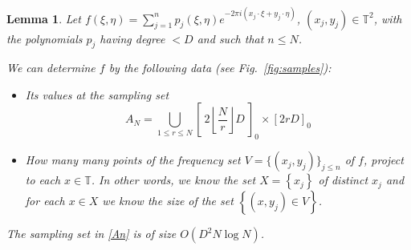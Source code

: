 \documentclass[12pt,a4paper,oneside]{amsart}
\newtheorem{lemma}{Lemma}[section]
\theoremstyle{definition}
\newcommand{\Floor}[1]{{\left\lfloor{#1}\right\rfloor}}
\newcommand{\Set}[1]{{\left\{{#1}\right\}}}
\newcommand{\TT}{{\mathbb T}}
\newcommand{\red}[1]{{#1}}
\newcounter{rem}
\begin{document}
\begin{lemma}\label{NlogN}
Let $f(\xi,\eta)= \sum_{j=1}^n p_j (\xi,\eta) e^{-2\pi i (x_j \cdot \xi + y_j \cdot \eta )}$\red{, $(x_j, y_j) \in \TT^2$,}  with the polynomials $p_j$ having degree $< D$ and such that $n \le N$.

We can determine $f$ by the following data (see Fig.\ \ref{fig:samples}):
\begin{itemize}
\item[(a)] Its values at the sampling set
\begin{equation}\label{An}
A_N = \bigcup_{1\le r\le N} \left[ \: 2\Floor{ \frac{N}{r}} D \: \right]_0 \times [2rD]_0
\end{equation}
\item[(b)] How many many points of the frequency set $V=\{(x_j,y_j)\}_{j\le n} $ of $f$,  project to each $x\in \red{\TT}$. \red{In other words, we know the set $X=\Set{x_j}$ of distinct $x_j$ and for each $x \in X$ we know the size of the set $\Set{(x, y_j) \in V}$.}
\end{itemize}
The sampling set in \eqref{An} is of size $O(D^2 N \log N)$.
\end{lemma}
\end{document}
